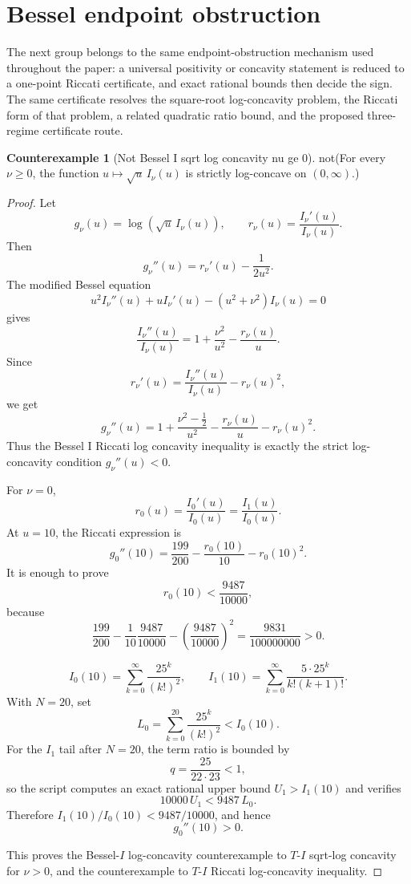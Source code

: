 \documentclass[11pt]{article}
\numberwithin{equation}{section}
\theoremstyle{definition}
\newtheorem{counterexample}[theorem]{Counterexample}
\theoremstyle{remark}
\newcommand{\1}{\mathbf 1}
\begin{document}
\section{Bessel endpoint obstruction}
\label{sec:bessel-endpoint-obstruction}



The next group belongs to the same endpoint-obstruction mechanism used throughout the paper: a universal positivity or concavity statement is reduced to a one-point Riccati certificate, and exact rational bounds then decide the sign.  The same certificate resolves the square-root log-concavity problem, the Riccati form of that problem, a related quadratic ratio bound, and the proposed three-regime certificate route.

\begin{counterexample}[Not Bessel I sqrt log concavity nu ge 0]
\label{res:not-bessel-i-sqrt-log-concavity-nu-ge-0}
not(For every \(\nu\ge0\), the function \(u\mapsto \sqrt{u}\,I_\nu(u)\) is strictly log-concave on \((0,\infty)\).)
\end{counterexample}

\begin{proof}
Let
\[
g_\nu(u)=\log(\sqrt u\,I_\nu(u)),
\qquad
r_\nu(u)=\frac{I_\nu'(u)}{I_\nu(u)}.
\]
Then
\[
g_\nu''(u)=r_\nu'(u)-\frac{1}{2u^2}.
\]
The modified Bessel equation
\[
u^2I_\nu''(u)+uI_\nu'(u)-(u^2+\nu^2)I_\nu(u)=0
\]
gives
\[
\frac{I_\nu''(u)}{I_\nu(u)}
=1+\frac{\nu^2}{u^2}-\frac{r_\nu(u)}{u}.
\]
Since
\[
r_\nu'(u)=\frac{I_\nu''(u)}{I_\nu(u)}-r_\nu(u)^2,
\]
we get
\[
g_\nu''(u)
=
1+\frac{\nu^2-\frac12}{u^2}
-\frac{r_\nu(u)}{u}
-r_\nu(u)^2.
\]
Thus the Bessel I Riccati log concavity inequality is exactly the strict log-concavity condition \(g_\nu''(u)<0\).

For \(\nu=0\),
\[
r_0(u)=\frac{I_0'(u)}{I_0(u)}=\frac{I_1(u)}{I_0(u)}.
\]
At \(u=10\), the Riccati expression is
\[
g_0''(10)=\frac{199}{200}-\frac{r_0(10)}{10}-r_0(10)^2.
\]
It is enough to prove
\[
r_0(10)<\frac{9487}{10000},
\]
because
\[
\frac{199}{200}
-\frac{1}{10}\frac{9487}{10000}
-\left(\frac{9487}{10000}\right)^2
=\frac{9831}{100000000}>0.
\]

\[
I_0(10)=\sum_{k=0}^{\infty}\frac{25^k}{(k!)^2},
\qquad
I_1(10)=\sum_{k=0}^{\infty}\frac{5\cdot25^k}{k!(k+1)!}.
\]
With \(N=20\), set
\[
L_0=\sum_{k=0}^{20}\frac{25^k}{(k!)^2}<I_0(10).
\]
For the \(I_1\) tail after \(N=20\), the term ratio is bounded by
\[
q=\frac{25}{22\cdot23}<1,
\]
so the script computes an exact rational upper bound \(U_1>I_1(10)\) and verifies
\[
10000\,U_1<9487\,L_0.
\]
Therefore \(I_1(10)/I_0(10)<9487/10000\), and hence
\[
g_0''(10)>0.
\]

This proves the Bessel-\(I\) log-concavity counterexample to \(T\)-\(I\) sqrt-log concavity for \(\nu>0\), and the counterexample to \(T\)-\(I\) Riccati log-concavity inequality.
\end{proof}
\end{document}
